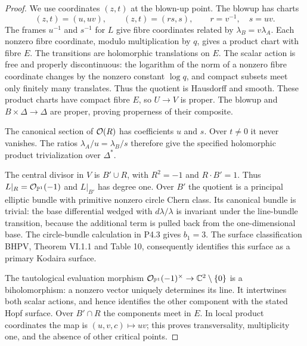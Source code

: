 \begin{proof}
We use coordinates $(z,t)$ at the blown-up point. The blowup has charts
\[
 (z,t)=(u,uv),\qquad (z,t)=(rs,s),\qquad r=v^{-1},\quad s=uv.
\]
The frames $u^{-1}$ and $s^{-1}$ for $L$ give fibre coordinates related by
$\lambda_B=v\lambda_A$. Each nonzero fibre coordinate, modulo multiplication
by $q$, gives a product chart with fibre $E$. The transitions are holomorphic
translations on $E$. The scalar action is free and properly discontinuous:
the logarithm of the norm of a nonzero fibre coordinate changes by the
nonzero constant $\log q$, and compact subsets meet only finitely many
translates. Thus the quotient is Hausdorff and smooth. These product charts
have compact fibre $E$, so $U\to V$ is proper. The blowup and $B\times\Delta
\to\Delta$ are proper, proving properness of their composite.

The canonical section of $\mathcal O(R)$ has coefficients $u$ and $s$. Over
$t\ne0$ it never vanishes. The ratios $\lambda_A/u=\lambda_B/s$ therefore
give the specified holomorphic product trivialization over $\Delta^*$.

The central divisor in $V$ is $B'\cup R$, with $R^2=-1$ and $R\cdot B'=1$.
Thus $L|_R=\mathcal O_{\mathbb P^1}(-1)$ and $L|_{B'}$ has degree one. Over $B'$ the
quotient is a principal elliptic bundle with primitive nonzero circle Chern
class. Its canonical bundle is trivial: the base differential wedged with
$d\lambda/\lambda$ is invariant under the line-bundle transition, because
the additional term is pulled back from the one-dimensional base. The
circle-bundle calculation in P4.3 gives $b_1=3$. The surface classification
BHPV, Theorem VI.1.1 and Table 10, consequently identifies this surface as
a primary Kodaira surface.

The tautological evaluation morphism
$\mathcal O_{\mathbb P^1}(-1)^\times\to\mathbb C^2\setminus\{0\}$ is a biholomorphism: a
nonzero vector uniquely determines its line. It intertwines both scalar
actions, and hence identifies the other component with the stated Hopf
surface. Over $B'\cap R$ the components meet in $E$. In local product
coordinates the map is $(u,v,c)\mapsto uv$; this proves transversality,
multiplicity one, and the absence of other critical points.
\end{proof}

